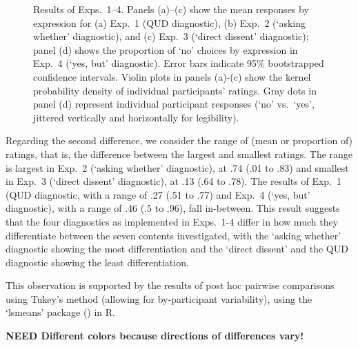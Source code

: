 \documentclass[times,linguex,xcolor]{glossa}
\begin{document}
\begin{figure}[h!]
    \caption{Results of Exps.~1--4. Panels (a)--(c) show the mean responses by expression for (a) Exp.~1 (QUD diagnostic),  (b) Exp.~2 (`asking whether' diagnostic), and (c) Exp.~3 (`direct dissent' diagnostic); panel (d) shows the proportion of `no' choices by expression in Exp.~4 (`yes, but' diagnostic). Error bars indicate 95\% bootstrapped confidence intervals. Violin plots in panels (a)-(c) show the kernel probability density of individual participants' ratings. Gray dots in panel (d) represent individual participant responses (`no' vs.\ `yes', jittered vertically and horizontally for legibility).}
    \label{fig:results}
  \end{figure}
  
Regarding the second difference, we consider the range of (mean or proportion of) ratings, that is, the difference between the largest and smallest ratings. The range is largest in Exp.~2 (`asking whether' diagnostic), at .74 (.01 to .83) and smallest in Exp.~3 (`direct dissent' diagnostic), at .13 (.64 to .78). The results of Exp.~1 (QUD diagnostic, with a range of .27 (.51 to .77) and Exp.~4 (`yes, but' diagnostic), with a range of .46 (.5 to .96), fall in-between. This result suggests that the four diagnostics as implemented in Exps.~1-4 differ in how much they differentiate between the seven contents investigated, with the `asking whether' diagnostic showing the most differentiation and the `direct dissent' and the QUD diagnostic showing the least differentiation.
  
 
 
  
 
This observation is supported by the results of post hoc pairwise comparisons using Tukey's method (allowing for by-participant variability), using the `lsmeans' package (\citealt{tukey}) in R.

{\bf NEED Different colors because directions of differences vary!}

\addtolength{\tabcolsep}{-.19em}
\end{document}
